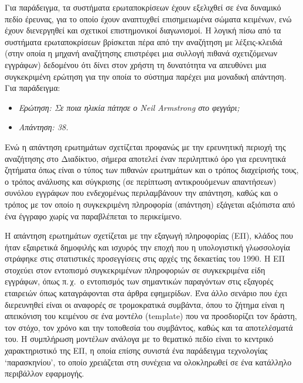 \documentclass[]{../../metanetpaper}
\begin{document}
\begin{multicols}{2}

Για παράδειγμα, τα συστήματα ερωταποκρίσεων έχουν εξελιχθεί σε ένα δυναμικό πεδίο έρευνας, για το οποίο έχουν αναπτυχθεί επισημειωμένα σώματα κειμένων, ενώ έχουν διενεργηθεί και σχετικοί επιστημονικοί διαγωνισμοί. Η λογική πίσω από τα συστήματα ερωταποκρίσεων βρίσκεται πέρα από την αναζήτηση με λέξεις-κλειδιά (στην οποία η μηχανή αναζήτησης επιστρέφει μια συλλογή πιθανά σχετιζόμενων εγγράφων) δεδομένου ότι δίνει στον χρήστη τη δυνατότητα να απευθύνει μια συγκεκριμένη ερώτηση για την οποία το σύστημα παρέχει μια μοναδική απάντηση. Για παράδειγμα:

\begin{itemize}
\item[] \textit{Ερώτηση: Σε ποια ηλικία πάτησε ο Neil Armstrong στο φεγγάρι;}
\item[] \textit{Απάντηση: 38.}
\end{itemize}

Ενώ η απάντηση ερωτημάτων σχετίζεται προφανώς με την ερευνητική περιοχή της αναζήτησης στο Διαδίκτυο, σήμερα αποτελεί έναν περιληπτικό όρο για ερευνητικά ζητήματα όπως είναι ο τύπος των πιθανών ερωτημάτων και ο τρόπος διαχείρισής τους, ο τρόπος ανάλυσης και σύγκρισης (σε περίπτωση αντικρουόμενων απαντήσεων) συνόλου εγγράφων που ενδεχομένως περιλαμβάνουν την απάντηση, καθώς και ο τρόπος με τον οποίο η συγκεκριμένη πληροφορία (απάντηση) εξάγεται αξιόπιστα από ένα έγγραφο χωρίς να παραβλέπεται το περικείμενο. 

Η απάντηση ερωτημάτων σχετίζεται με την εξαγωγή πληροφορίας (ΕΠ), κλάδος που ήταν εξαιρετικά δημοφιλής και ισχυρός την εποχή που η υπολογιστική γλωσσολογία στράφηκε στις στατιστικές προσεγγίσεις στις αρχές της δεκαετίας του 1990. Η ΕΠ στοχεύει στον εντοπισμό συγκεκριμένων πληροφοριών σε συγκεκριμένα είδη εγγράφων, όπως π.\,χ.~ο εντοπισμός των σημαντικών παραγόντων  στις εξαγορές εταιρειών όπως καταγράφονται στα άρθρα εφημερίδων. Ένα άλλο σενάριο που έχει διερευνηθεί είναι οι αναφορές σε τρομοκρατικά συμβάντα, όπου το ζήτημα είναι η απεικόνιση του κειμένου σε ένα μοντέλο (template) που να προσδιορίζει τον δράστη, τον στόχο, τον χρόνο και την τοποθεσία του συμβάντος, καθώς και τα αποτελέσματά του. Η συμπλήρωση μοντέλων ανάλογα με το θεματικό πεδίο είναι το κεντρικό χαρακτηριστικό της EΠ, η οποία επίσης συνιστά ένα παράδειγμα τεχνολογίας ‘παρασκηνίου’, το οποίο χρειάζεται στη συνέχεια να ολοκληρωθεί σε ένα κατάλληλο περιβάλλον εφαρμογής. 


\end{multicols}
\end{document}
